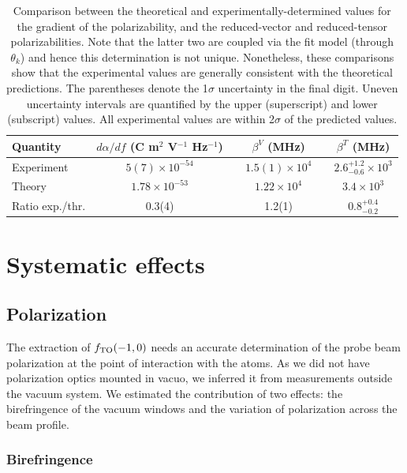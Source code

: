 	\begin{table}
	    \centering
	    \begin{tabular}{l c c c c c}
	        \hline\hline
	         Quantity & $d\alpha/df$ (C m$^2$ V$^{-1}$ Hz$^{-1}$) && $\beta^V$ (MHz) &&  $\beta^T$ (MHz)\\
	         \hline
	         Experiment & $5(7)\times10^{-54}$ &&  $1.5(1)\times10^4$ && $2.6^{+1.2}_{-0.6}\times10^3$\\
	         Theory & $1.78\times10^{-53}$ && $1.22\times10^4$ && $3.4\times10^3$\\
	         Ratio exp./thr. & 0.3(4) && 1.2(1) && \(0.8^{+0.4}_{-0.2}\)\\
	         \hline\hline
	    \end{tabular}
	    \caption{Comparison between the theoretical and experimentally-determined values for the gradient of the polarizability, and the reduced-vector and reduced-tensor polarizabilities. Note that the latter two are coupled via the fit model (through $\theta_k$) and hence this determination is not unique. Nonetheless, these comparisons show that the experimental values are generally consistent with the theoretical predictions. The parentheses denote the 1$\sigma$ uncertainty in the final digit. Uneven uncertainty intervals are quantified by the upper (superscript) and lower (subscript) values. All experimental values are within 2$\sigma$ of the predicted values.}
	    \label{tab:param_compare}
	\end{table}
\section{Systematic effects}
\label{sec:systematic_effects}

	
	

\subsection{Polarization}

	 The extraction of \(f_\mathrm{TO}(-1,0)\) needs an accurate determination of the probe beam polarization at the point of interaction with the atoms. 
	 As we did not have polarization optics mounted in vacuo, we inferred it from measurements outside the vacuum system. 
	 We estimated the contribution of two effects: the birefringence of the vacuum windows and the variation of polarization across the beam profile.
	 

\subsubsection{Birefringence}
	
